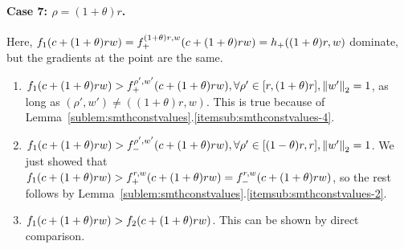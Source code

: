 \paragraph{Case 7: $\rho = (1+\theta)r$.}
Here, $f_{1}(c+(1+\theta)r w) = f_+^{{(1+\theta)r},{w}}(c+(1+\theta)r w) = h_+((1+\theta)r, w)$ dominate,
but the gradients at the point are the same. 
\begin{enumerate}
	\item $f_{1}(c+(1+\theta)r w)  > f_+^{{\rho'},{w'}}(c+(1+\theta)r w), 
	\forall \rho' \in [r,(1+\theta)r], \left\|{w'}\right\|_2 = 1$, as long as $(\rho', w') \neq ((1+\theta)r, w)$.
	This is true because of Lemma~\ref{sublem:smthconstvalues}.\ref{itemsub:smthconstvalues-4}.
	\item $f_{1}(c+(1+\theta)r w) > f_-^{{\rho'},{w'}}(c+(1+\theta)r w), 
	\forall \rho' \in [(1-\theta)r,r], \left\|{w'}\right\|_2 = 1$.
	We just showed that
	$f_{1}(c+(1+\theta)r w) > f_+^{{r},{w}}(c+(1+\theta)r w) = f_-^{{r},{w}}(c+(1+\theta)r w)$,
	so the rest follows by Lemma~\ref{sublem:smthconstvalues}.\ref{itemsub:smthconstvalues-2}.
	\item $f_{1}(c+(1+\theta)r w) > f_{2}(c+(1+\theta)r w)$. This can be shown by direct comparison.
\end{enumerate}

